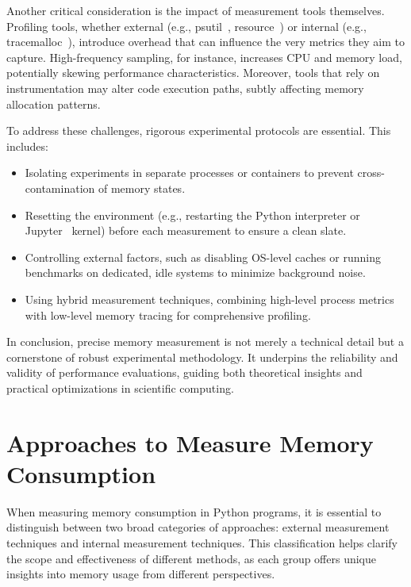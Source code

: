 Another critical consideration is the impact of measurement tools themselves.
Profiling tools, whether external (e.g., psutil~\cite{psutil}, resource~\cite{importlib_resources}) or internal (e.g., tracemalloc~\cite{tracemalloc}), introduce overhead that can influence the very metrics they aim to capture.
High-frequency sampling, for instance, increases \ac{CPU} and memory load, potentially skewing performance characteristics.
Moreover, tools that rely on instrumentation may alter code execution paths, subtly affecting memory allocation patterns.

To address these challenges, rigorous experimental protocols are essential.
This includes:

\begin{itemize}
    \item Isolating experiments in separate processes or containers to prevent cross-contamination of memory states.
    \item Resetting the environment (e.g., restarting the Python interpreter or Jupyter~\cite{jupyter} kernel) before each measurement to ensure a clean slate.
    \item Controlling external factors, such as disabling OS-level caches or running benchmarks on dedicated, idle systems to minimize background noise.
    \item Using hybrid measurement techniques, combining high-level process metrics with low-level memory tracing for comprehensive profiling.
\end{itemize}

In conclusion, precise memory measurement is not merely a technical detail but a cornerstone of robust experimental methodology.
It underpins the reliability and validity of performance evaluations, guiding both theoretical insights and practical optimizations in scientific computing.


\section{Approaches to Measure Memory Consumption}
\label{sec:mmc-approaches}

When measuring memory consumption in Python programs, it is essential to distinguish between two broad categories of approaches: external measurement techniques and internal measurement techniques.
This classification helps clarify the scope and effectiveness of different methods, as each group offers unique insights into memory usage from different perspectives.

